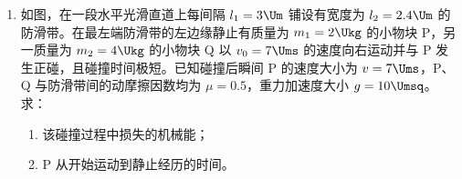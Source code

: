 \documentclass[\gkver]{gaokaozhenti}
\begin{document}
\begin{enumerate}
{由牛顿第二定律 $qE = ma$

解得含 A 细胞的液滴离开电场时偏转的距离为 $x_{1} = 5 \times 10^{-3} \Um$

（2）含 A 细胞的液滴离开电场后做匀速直线运动，则 $h = vt_{2}$

则 $x_{2} = at_{1}t_{2}$

联立解得 $x_{2} = 0.05 \Um$

由对称性可知则 A、B 细胞收集管的间距 $\Delta x = 2(x_{1} + x_{2}) = 2 \times (0.005 + 0.05) \Um = 0.11 \Um$
}

\item
如图，在一段水平光滑直道上每间隔 $l_{1} = 3 \Um$ 铺设有宽度为 $l_{2} = 2.4 \Um$ 的防滑带。在最左端防滑带的左边缘静止有质量为 $m_{1} = 2 \Ukg$ 的小物块 P，另一质量为 $m_{2} = 4 \Ukg$ 的小物块 Q 以 $v_{0} = 7 \Ums$ 的速度向右运动并与 P 发生正碰，且碰撞时间极短。已知碰撞后瞬间 P 的速度大小为 $v = 7 \Ums$，P、Q 与防滑带间的动摩擦因数均为 $\mu = 0.5$，重力加速度大小 $g = 10 \Umsq$。求：

\begin{enumerate}
	\item
	该碰撞过程中损失的机械能；
	\item
	P 从开始运动到静止经历的时间。
\end{enumerate}


\jdanswer{
\begin{enumerate}
	\item
	$24.5 \UJ$

	\item
	$5 \Us$
\end{enumerate}
}
\end{enumerate}
\end{document}
